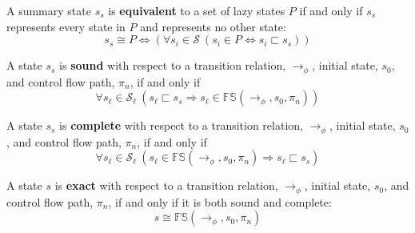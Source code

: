 \begin{definition}
\label{equivalent}
A summary state $s_s$ is \textbf{equivalent} to a set of lazy states $P$ if and only if $s_s$ represents every state in $P$ and represents no other state: 
$$s_s \cong P \Leftrightarrow (\forall s_i \in \mathcal{S}\ (s_i \in P \Leftrightarrow s_i \sqsubset s_s) )$$
\end{definition}

\begin{definition}
\label{sound}
A state $s_s$ is \textbf{sound} with respect to a transition relation, $\rightarrow_\phi$, initial state, $s_0$, and control flow path, $\pi_n$, if and only if 
$$ \forall s_\ell \in \mathcal{S}_\ell\ (s_\ell \sqsubset s_s \Rightarrow s_\ell \in \mathbb{FS}(\rightarrow_{\phi},s_0,\pi_n) ) $$
\end{definition}

\begin{definition}
\label{complete}
A state $s_s$ is \textbf{complete} with respect to a transition relation, $\rightarrow_\phi$, initial state, $s_0$, and control flow path, $\pi_n$, if and only if 
$$ \forall s_\ell \in \mathcal{S}_\ell\ ( s_\ell \in \mathbb{FS}(\rightarrow_{\phi},s_0,\pi_n)\Rightarrow s_\ell \sqsubset s_s ) $$
\end{definition}

\begin{definition}
\label{exact}
A state $s$ is \textbf{exact} with respect to a transition relation, $\rightarrow_\phi$, initial state, $s_0$, and control flow path, $\pi_n$, if and only if it is both sound and complete:
$$ s \cong \mathbb{FS}(\rightarrow_{\phi},s_0,\pi_n)$$
\end{definition}

